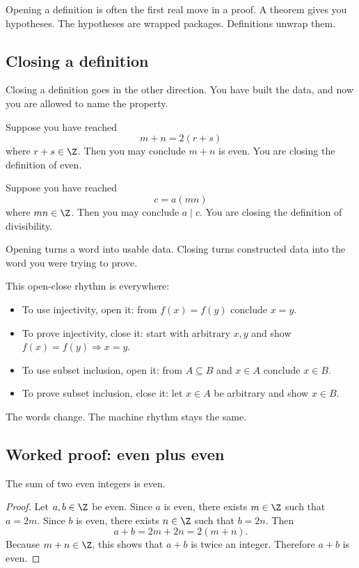 Opening a definition is often the first real move in a proof. A theorem gives you hypotheses. The hypotheses are wrapped packages. Definitions unwrap them.

\subsection{Closing a definition}

Closing a definition goes in the other direction. You have built the data, and now you are allowed to name the property.

Suppose you have reached
\[
m+n=2(r+s)
\]
where $r+s\in\Z$. Then you may conclude $m+n$ is even. You are closing the definition of even.

Suppose you have reached
\[
c=a(mn)
\]
where $mn\in\Z$. Then you may conclude $a\mid c$. You are closing the definition of divisibility.

\begin{focusbox}
Opening turns a word into usable data. Closing turns constructed data into the word you were trying to prove.
\end{focusbox}

This open-close rhythm is everywhere:

\begin{itemize}
\item To use injectivity, open it: from $f(x)=f(y)$ conclude $x=y$.
\item To prove injectivity, close it: start with arbitrary $x,y$ and show $f(x)=f(y)\Rightarrow x=y$.
\item To use subset inclusion, open it: from $A\subseteq B$ and $x\in A$ conclude $x\in B$.
\item To prove subset inclusion, close it: let $x\in A$ be arbitrary and show $x\in B$.
\end{itemize}

The words change. The machine rhythm stays the same.

\subsection{Worked proof: even plus even}

\begin{theorem}
The sum of two even integers is even.
\end{theorem}

\begin{proof}
Let $a,b\in\Z$ be even. Since $a$ is even, there exists $m\in\Z$ such that $a=2m$. Since $b$ is even, there exists $n\in\Z$ such that $b=2n$. Then
\[
a+b=2m+2n=2(m+n).
\]
Because $m+n\in\Z$, this shows that $a+b$ is twice an integer. Therefore $a+b$ is even.
\end{proof}

